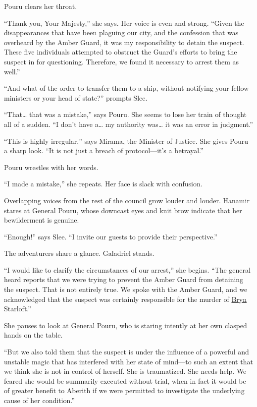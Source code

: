 \documentclass[smalldemyvopaper,11pt,twoside,onecolumn,openright,extrafontsizes]{memoir}
\begin{document}
Pouru clears her throat.

``Thank you, Your Majesty,'' she says. Her voice is even and strong.
``Given the disappearances that have been plaguing our city, and the
confession that was overheard by the Amber Guard, it was my
responsibility to detain the suspect. These five individuals attempted
to obstruct the Guard's efforts to bring the suspect in for questioning.
Therefore, we found it necessary to arrest them as well.''

``And what of the order to transfer them to a ship, without notifying
your fellow ministers or your head of state?'' prompts Slee.

``That\ldots{} that was a mistake,'' says Pouru. She seems to lose her
train of thought all of a sudden. ``I don't have a\ldots{} my authority
was\ldots{} it was an error in judgment.''

``This is highly irregular,'' says Mirama, the Minister of Justice. She
gives Pouru a sharp look. ``It is not just a breach of protocol---it's a
betrayal.''

Pouru wrestles with her words.

``I made a mistake,'' she repeats. Her face is slack with confusion.

Overlapping voices from the rest of the council grow louder and louder.
Hanamir stares at General Pouru, whose downcast eyes and knit brow
indicate that her bewilderment is genuine.

``Enough!'' says Slee. ``I invite our guests to provide their
perspective.''

The adventurers share a glance. Galadriel stands.

``I would like to clarify the circumstances of our arrest,'' she begins.
``The general heard reports that we were trying to prevent the Amber
Guard from detaining the suspect. That is not entirely true. We spoke
with the Amber Guard, and we acknowledged that the suspect was certainly
responsible for the murder of \href{/characters/bryn/}{Bryn} Starloft.''

She pauses to look at General Pouru, who is staring intently at her own
clasped hands on the table.

``But we also told them that the suspect is under the influence of a
powerful and unstable magic that has interfered with her state of
mind---to such an extent that we think she is not in control of herself.
She is traumatized. She needs help. We feared she would be summarily
executed without trial, when in fact it would be of greater benefit to
Aberith if we were permitted to investigate the underlying cause of her
condition.''
\end{document}
